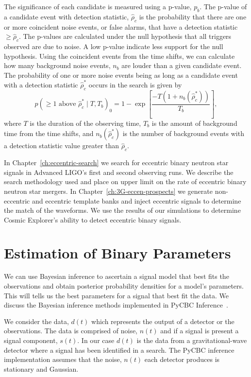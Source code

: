 The significance of each candidate is measured using a p-value, $p_b$. The p-value of a candidate event with detection statistic, $\hat{\rho}_c$ is the probability that there are one or more coincident noise events, or false alarms, that have a detection statistic $\geq \hat{\rho}_c$. The p-values are calculated under the null hypothesis that all triggers observed are due to noise. A low p-value indicate less support for the null hypothesis. Using the coincident events from the time shifts, we can calculate how many background noise events, $n_b$ are louder than a given candidate event. The probability of one or more noise events being as long as a candidate event with a detection statistic $\hat{\rho}_c^*$ occurs in the search is given by
\begin{equation}
    p\left(\geq 1 \text { above } \hat{\rho}_{c}^{*} \mid T, T_{b}\right)_{0}=1-\exp \left[\frac{-T\left(1+n_{b}\left(\hat{\rho}_{c}^{*}\right)\right)}{T_{b}}\right],
\end{equation}
where $T$ is the duration of the observing time, $T_b$ is the amount of background time from the time shifts, and $n_{b}(\hat{\rho}_{c}^{*})$ is the number of background events with a detection statistic value greater than $\hat{\rho}_{c}$.

In Chapter~\ref{ch:eccentric-search} we search for eccentric binary neutron star signals in Advanced LIGO's first and second observing runs. We describe the search methodology used and place on upper limit on the rate of eccentric binary neutron star mergers. In Chapter~\ref{ch:3G-eccen-prospects} we generate non-eccentric and eccentric template banks and inject eccentric signals to determine the match of the waveforms. We use the results of our simulations to determine Cosmic Explorer's ability to detect eccentric binary signals.

\section{Estimation of Binary Parameters}\label{methods-PE}

We can use Bayesian inference to ascertain a signal model that best fits the observations and obtain posterior probability densities for a model's parameters. This will tells us the best parameters for a signal that best fit the data. We discuss the Bayesian inference methods implemented in PyCBC Inference~\cite{Biwer:2018osg}. 

We consider the data, $d(t)$ which represents the output of a detector or the observations. The data is comprised of noise, $n(t)$ and if a signal is present a signal component, $s(t)$. In our case $d(t)$ is the data from a gravitational-wave detector where a signal has been identified in a search. The PyCBC inference implementation assumes that the noise, $n(t)$ each detector produces is stationary and Gaussian.

